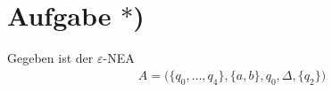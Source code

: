 




\section*{Aufgabe $\ast$)}
Gegeben ist der $\varepsilon$-NEA
\begin{align*}
	A=\Big(\lbrace q_0,\ldots,q_4\rbrace,\lbrace a,b\rbrace,q_0,\Delta,\lbrace q_2\rbrace\Big)
\end{align*}


